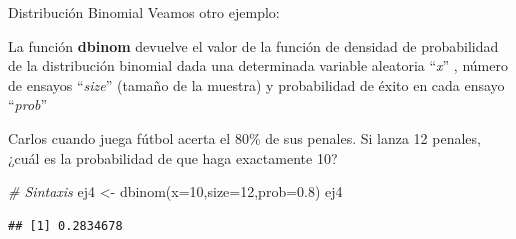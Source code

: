 \documentclass[
  8pt,
  ignorenonframetext,
]{beamer}
\newenvironment{Shaded}{\begin{snugshade}}{\end{snugshade}}
\newcommand{\AttributeTok}[1]{\textcolor[rgb]{0.77,0.63,0.00}{#1}}
\newcommand{\CommentTok}[1]{\textcolor[rgb]{0.56,0.35,0.01}{\textit{#1}}}
\newcommand{\DecValTok}[1]{\textcolor[rgb]{0.00,0.00,0.81}{#1}}
\newcommand{\FloatTok}[1]{\textcolor[rgb]{0.00,0.00,0.81}{#1}}
\newcommand{\FunctionTok}[1]{\textcolor[rgb]{0.00,0.00,0.00}{#1}}
\newcommand{\NormalTok}[1]{#1}
\newcommand{\OtherTok}[1]{\textcolor[rgb]{0.56,0.35,0.01}{#1}}
\begin{document}
\begin{frame}[fragile]{Distribución Binomial}
\protect\hypertarget{distribuciuxf3n-binomial-4}{}
Veamos otro ejemplo:

La función \textbf{dbinom} devuelve el valor de la función de densidad
de probabilidad de la distribución binomial dada una determinada
variable aleatoria ``\emph{x}'' , número de ensayos ``\emph{size}''
(tamaño de la muestra) y probabilidad de éxito en cada ensayo
``\emph{prob}''

Carlos cuando juega fútbol acerta el 80\% de sus penales. Si lanza 12
penales, ¿cuál es la probabilidad de que haga exactamente 10?

\begin{Shaded}
\begin{Highlighting}[]
\CommentTok{\# Sintaxis}
\NormalTok{ej4 }\OtherTok{\textless{}{-}} \FunctionTok{dbinom}\NormalTok{(}\AttributeTok{x=}\DecValTok{10}\NormalTok{,}\AttributeTok{size=}\DecValTok{12}\NormalTok{,}\AttributeTok{prob=}\FloatTok{0.8}\NormalTok{)}
\NormalTok{ej4}
\end{Highlighting}
\end{Shaded}

\begin{verbatim}
## [1] 0.2834678
\end{verbatim}
\end{frame}
\end{document}
